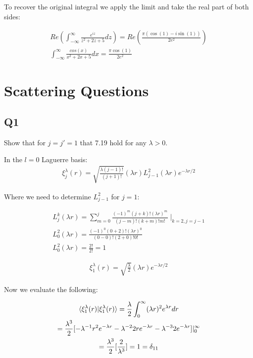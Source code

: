 \documentclass{article}
\begin{document}
			To recover the original integral we apply the limit and take the real part of both sides:
			
			\begin{gather}
				Re\left( \int_{-\infty}^{\infty}\frac{e^{iz}}{z^2+2z+5}dz\right) = Re\left(\frac{\pi(\cos(1)-i\sin(1))}{2e^2}\right)\\
				\int_{-\infty}^{\infty}\frac{cos(x)}{x^2+2x+5}dx = \frac{\pi \cos(1)}{2e^2}
			\end{gather}
			
			 
			
			
		
	
	\section{Scattering Questions}
		\subsection{Q1}
		Show that for $j=j'=1$ that 7.19 hold for any $\lambda>0$.
		
		In the $l=0$ Laguerre basis:
		\begin{gather}
			\xi^{\lambda}_{j}(r) = \sqrt{\frac{\lambda(j-1)!}{(j+1)!}}(\lambda r)L^{2}_{j-1}(\lambda r)e^{-\lambda r / 2}
		\end{gather}
		
		Where we need to determine $L^{2}_{j-1}$ for $j=1$:
		
		\begin{gather}
			L^{k}_{j}(\lambda r) = \sum_{m=0}^{j} \frac{(-1)^m (j+k)!(\lambda r)^m}{(j-m)!(k+m)!m!}\; |_{k=2,j=j-1}\\
			L^{2}_{0}(\lambda r) = \frac{(-1)^0 (0+2)!(\lambda r)^0}{(0-0)!(2+0)!0!}\\
			L^{2}_{0}(\lambda r) = \frac{2!}{2!} = 1
		\end{gather}
		
		\begin{gather}
			\xi^{\lambda}_{1}(r) = \sqrt{\frac{\lambda}{2}}(\lambda r)e^{-\lambda r / 2}
		\end{gather}
		
		Now we evaluate the following:
		
		\begin{gather}
			\braket{\xi^{\lambda}_{1}(r)|\xi^{\lambda}_{1}(r)} = \frac{\lambda}{2}\int_{0}^{\infty} (\lambda r)^2 e^{\lambda r} dr\\
			= \frac{\lambda^3}{2}[-\lambda^{-1}r^2e^{-\lambda r} -\lambda^{-2}2re^{-\lambda r} -\lambda^{-3}2e^{-\lambda r}]|^{\infty}_{0}\\
			= \frac{\lambda^3}{2} [\frac{2}{\lambda^3}] = 1 = \delta_{11}
		\end{gather}
		
\end{document}
